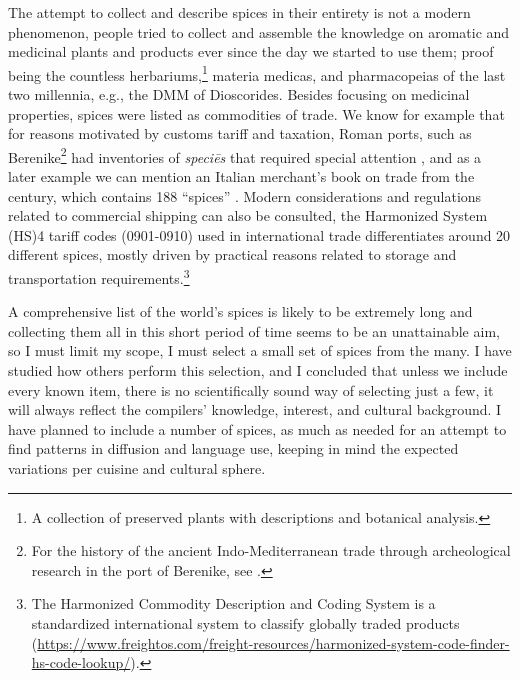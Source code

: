 The attempt to collect and describe spices in their entirety is not a modern phenomenon, people tried to collect and assemble the knowledge on aromatic and medicinal plants and products ever since the day we started to use them; proof being the countless herbariums,\footnote{A collection of preserved plants with descriptions and botanical analysis.} \glspl{materia medica}, and \glspl{pharmacopeia} of the last two millennia, e.g., the \gls{DMM} of Dioscorides. Besides focusing on medicinal properties, spices were listed as commodities of trade. We know for example that for reasons motivated by customs tariff and taxation, Roman ports, such as Berenike\footnote{For the history of the ancient Indo-Mediterranean trade through archeological research in the port of Berenike, see \textcite{sidebotham_berenike_2011}.} had inventories of \textit{speciēs} that required special attention \autocite{parthasarathi_roman_2015}, and as a later example we can mention an Italian merchant's book on trade from the  century, which contains 188 ``spices'' \autocite[411-435]{pegolotti_pratica_1936}. Modern considerations and regulations related to commercial shipping can also be consulted, the Harmonized System (HS)4 tariff codes (0901-0910) used in international trade differentiates around 20 different spices, mostly driven by practical reasons related to storage and transportation requirements.\footnote{The Harmonized Commodity Description and Coding System is a standardized international system to classify globally traded products (\url{https://www.freightos.com/freight-resources/harmonized-system-code-finder-hs-code-lookup/}).}


A comprehensive list of the world's spices is likely to be extremely long and collecting them all in this short period of time seems to be an unattainable aim, so I must limit my scope, I must select a small set of spices from the many. I have studied how others perform this selection, and I concluded that unless we include every known item, there is no scientifically sound way of selecting just a few, it will always reflect the compilers' knowledge, interest, and cultural background. I have planned to include a number of spices, as much as needed for an attempt to find patterns in diffusion and language use, keeping in mind the expected variations per cuisine and cultural sphere. 



